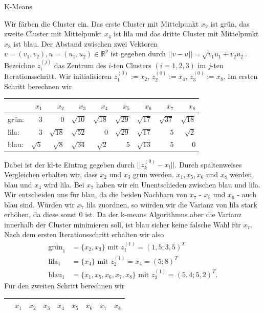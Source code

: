 \begin{task}[credit=6]{K-Means}
\begin{subtask}[points=6,title={K-Means Algorithmus}]
\begin{solution}
Wir färben die Cluster ein. Das erste Cluster mit Mittelpunkt $x_2$ ist grün, das zweite Cluster mit Mittelpunkt $x_4$ ist lila und das dritte Cluster mit Mittelpunkt $x_8$ ist blau. Der Abstand zwischen zwei Vektoren $v = (v_1, v_2), u = (u_1, u_2) \in \mathbb{R}^2$ ist gegeben durch $||v-u||= \sqrt{v_1u_1 + v_2u_2}$. Bezeichne $z_i^{(j)}$ das Zentrum des $i$-ten Clusters $(i = 1,2,3)$ im $j$-ten Iterationsschritt. Wir initialisieren $z_1^{(0)} := x_2$, $z_2^{(0)} := x_4$, $z_3^{(0)} := x_8$. Im ersten Schritt berechnen wir \begin{center}
\begin{tabular}{l|rrrrrrrr}
	      & $x_1$ & $x_2$ & $x_3$ & $x_4$ & $x_5$ & $x_6$ & $x_7$ & $x_8$ \\ \hline
	grün: & $3$ & $0$ & $\sqrt{10}$ & $\sqrt{18}$ & $\sqrt{29}$ & $\sqrt{17}$ & $\sqrt{37}$ & $\sqrt{18}$  \\
	lila: & $3$ & $\sqrt{18}$ & $\sqrt{52}$ & $0$ & $\sqrt{29}$ & $\sqrt{17}$ & $5$ & $\sqrt{2}$ \\
	blau: & $\sqrt{5}$ & $\sqrt{8}$ & $\sqrt{34}$ & $\sqrt{2}$ & $5$ & $\sqrt{13}$ & $5$ & $0$
\end{tabular}
\end{center} 
Dabei ist der kl-te Eintrag gegeben durch $||z_k^{(0)}-x_l||$. Durch spaltenweises Vergleichen erhalten wir, dass $x_2$ und $x_3$ grün werden. $x_1, x_5,x_6$ und $x_8$ werden blau und $x_4$ wird lila. Bei $x_7$ haben wir ein Unentschieden zwischen blau und lila. Wir entscheiden uns für blau, da die beiden Nachbarn von $x_7$ - $x_5$ und $x_6$ - auch blau sind. Würden wir $x_7$ lila zuordnen, so würden wir die Varianz von lila stark erhöhen, da diese sonst 0 ist. Da der k-means Algorithmus aber die Varianz innerhalb der Cluster minimieren soll, ist blau sicher keine falsche Wahl für $x_7$. \\ Nach dem ersten Iterationsschritt erhalten wir also \begin{align*}
\text{grün}_1 &= \{x_2, x_3\} \text{ mit } z_1^{(1)} = (1,5; 3,5)^T \\
\text{lila}_1 &= \{x_4\} \text{ mit } z_2^{(1)} = x_4 = (5;8)^T \\
\text{blau}_1 &= \{x_1, x_5, x_6, x_7, x_8\} \text{ mit } z_3^{(1)} = (5,4;5,2)^T.
\end{align*}
Für den zweiten Schritt berechnen wir \begin{center}
	\begin{tabular}{l|rrrrrrrr}
		& $x_1$ & $x_2$ & $x_3$ & $x_4$ & $x_5$ & $x_6$ & $x_7$ & $x_8$ \\ \hline

\end{tabular}
\end{center}
\end{solution}
\end{subtask}
\end{task}
